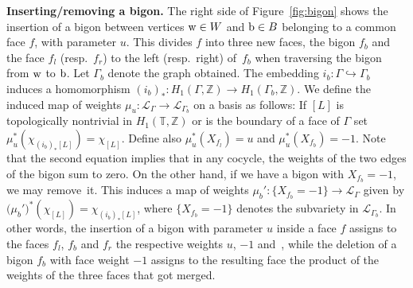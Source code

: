 \documentclass[pdftex]{sigma}
\numberwithin{equation}{section}
\newcommand{\Z}{{\mathbb Z}}
\newcommand{\T}{{\mathbb T}}
\newcommand{\ra}{\rightarrow}
\newcommand{\w}{{\rm w}}
\newcommand{\bw}{{\rm b}}
\begin{document}
	
	{\bf Inserting/removing a bigon.}
	The right side of Figure~\ref{fig:bigon} shows the insertion of a bigon between vertices $\w \in W$ and $\bw \in B$ belonging to a common face $f$, with parameter $u$. This divides $f$ into three new faces, the bigon $f_b$ and the face $f_l$ (resp.\ $f_r$) to the left (resp.\ right) of~$f_b$ when traversing the bigon from $\rm w$ to $\rm b$. Let $\Gamma_b$ denote the graph obtained. The embedding $i_b\colon \Gamma \hookrightarrow \Gamma_b$ induces a homomorphism $(i_b)_*\colon H_1(\Gamma,\Z) \ra H_1(\Gamma_b,\Z)$. We define the induced map of weights $\mu_u\colon \mathcal L_\Gamma \ra \mathcal L_{\Gamma_b}$ on a basis as follows: If $[L]$ is topologically nontrivial in $H_1(\T,\Z)$ or is the boundary of a face of $\Gamma$ set $\mu_u^*(\chi_{(i_b)_*[L]})=\chi_{[L]}$. Define also $\mu_u^*(X_{f_l})=u$ and $\mu_u^*(X_{f_b})=-1$. Note that the second equation implies that in any cocycle, the weights of the two edges of the bigon sum to zero. On the other hand, if we have a bigon with $X_{f_b}=-1$, we may remove~it. This induces a map of weights $\mu_b'\colon \{X_{f_b}=-1\} \ra \mathcal L_\Gamma$ given by $\big(\mu_b'\big)^*(\chi_{[L]})=\chi_{(i_b)_*[L]}$, where $\{X_{f_b}=-1\}$ denotes the subvariety in $ \mathcal L_{\Gamma_b}$. In other words, the insertion of a bigon with parameter $u$ inside a face $f$ assigns to the faces $f_l$, $f_b$ and $f_r$ the respective weights $u$, $-1$ and~, while the deletion of a bigon $f_b$ with face weight $-1$ assigns to the resulting face the product of the weights of the three faces that got merged.
	
\end{document}
